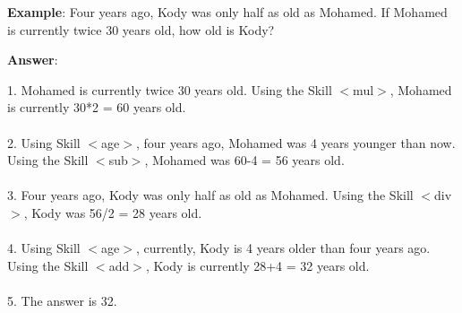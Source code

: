 \documentclass{article} %
\begin{document}
\newpage


\begin{tcolorbox}[title = {An Example of Skill Composition for GSM8K}, colback = Apricot!25!white, colframe = BrickRed!75!black] 
\textbf{Example}:  Four years ago, Kody was only half as old as Mohamed. If Mohamed is currently twice 30 years old,  how old is Kody? 

 \quad

\textbf{Answer}:

1. Mohamed is currently twice 30 years old. Using the Skill $<$mul$>$, Mohamed is currently 30*2 = 60 years old. \\ \\
2. Using Skill $<$age$>$, four years ago, Mohamed was 4 years younger than now. Using the Skill $<$sub$>$,  Mohamed was 60-4 = 56 years old.  \\ \\
3. Four years ago, Kody was only half as old as Mohamed. Using the Skill $<$div$>$, Kody was 56/2 = 28 years old. \\ \\
4. Using Skill $<$age$>$, currently, Kody is 4 years older than four years ago. Using the Skill $<$add$>$, Kody is currently 28+4 = 32 years old. \\ \\
5. The answer is 32. 
\end{tcolorbox}
\noindent\begin{minipage}{\textwidth}  
 \label{Tab:compose_gsm8k_skill}
\end{minipage}

\newpage
\end{document}
